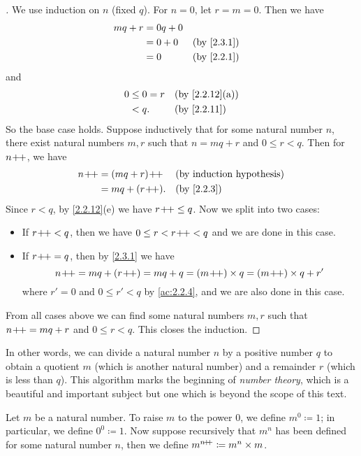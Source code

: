 \begin{proof}[]
  We use induction on \(n\) (fixed \(q\)).
  For \(n = 0\), let \(r = m = 0\).
  Then we have
  \begin{align*}
    mq + r & = 0q + 0                 \\
           & = 0 + 0  &  & \by{2.3.1} \\
           & = 0      &  & \by{2.2.1}
  \end{align*}
  and
  \begin{align*}
    0 & \leq 0 = r &  & \by{2.2.12}[a] \\
      & < q.       &  & \by{2.2.11}
  \end{align*}
  So the base case holds.
  Suppose inductively that for some natural number \(n\), there exist natural numbers \(m, r\) such that \(n = mq + r\) and \(0 \leq r < q\).
  Then for \(n\!+\!\!+\), we have
  \begin{align*}
    n\pp & = (mq + r)\pp  &  & \byIH      \\
         & = mq + (r\pp). &  & \by{2.2.3} \\
  \end{align*}
  Since \(r < q\), by \cref{2.2.12}(e) we have \(r\!+\!\!+ \leq q\).
  Now we split into two cases:
  \begin{itemize}
    \item If \(r\!+\!\!+ < q\), then we have \(0 \leq r < r\!+\!\!+ < q\) and we are done in this case.
    \item If \(r\!+\!\!+ = q\), then by \cref{2.3.1} we have
          \[
            n\pp = mq + (r\pp) = mq + q = (m\pp) \times q = (m\pp) \times q + r'
          \]
          where \(r' = 0\) and \(0 \leq r' < q\) by \cref{ac:2.2.4}, and we are also done in this case.
  \end{itemize}
  From all cases above we can find some natural numbers \(m, r\) such that \(n\!+\!\!+ = mq + r\) and \(0 \leq r < q\).
  This closes the induction.
\end{proof}

\begin{rmk}\label{2.3.10}
  In other words, we can divide a natural number \(n\) by a positive number \(q\) to obtain a quotient \(m\) (which is another natural number) and a remainder \(r\) (which is less than \(q\)).
  This algorithm marks the beginning of \emph{number theory}, which is a beautiful and important subject but one which is beyond the scope of this text.
\end{rmk}

\begin{defn}\label{2.3.11}
  Let \(m\) be a natural number.
  To raise \(m\) to the power \(0\), we define \(m^0 \coloneqq 1\); in particular, we define \(0^0 \coloneqq 1\).
  Now suppose recursively that \(m^n\) has been defined for some natural number \(n\), then we define \(m^{n\!+\!\!+} \coloneqq m^n \times m\).
\end{defn}

